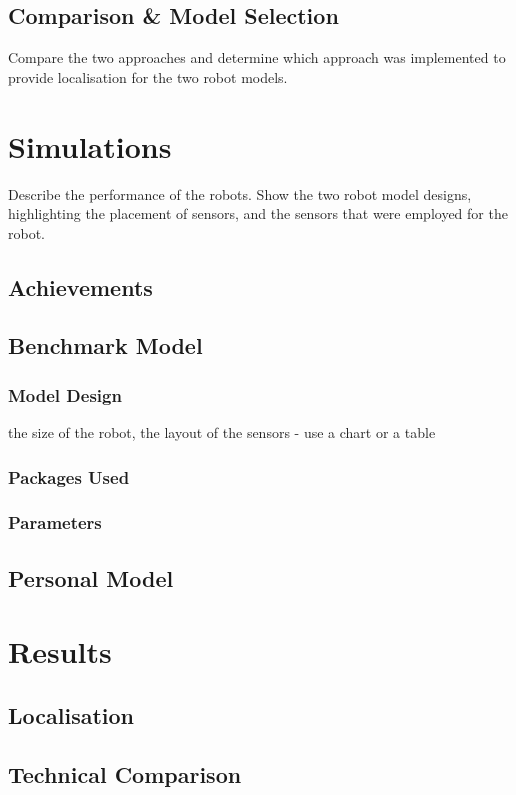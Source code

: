 \documentclass[a4paper]{article}
\begin{document}
\subsection{Comparison \& Model Selection}
Compare the two approaches and determine which approach was implemented to provide localisation for the two robot models.

\section{Simulations}
Describe the performance of the robots. Show the two robot model designs, highlighting the placement of sensors, and the sensors that were employed for the robot.

\subsection{Achievements}

\subsection{Benchmark Model}
\subsubsection{Model Design}
the size of the robot, the layout of the sensors - use a chart or a table

\subsubsection{Packages Used}


\subsubsection{Parameters}

\subsection{Personal Model}

\section{Results}
\subsection{Localisation}
\subsection{Technical Comparison}
\end{document}
